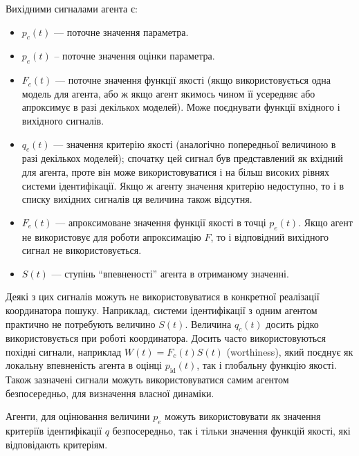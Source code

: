 Вихідними сигналами агента є:\label{atu:d:agent_out_list}

\begin{itemize}

  \item
    $p_c(t)$ ---
    поточне значення параметра.

  \item
    $p_e(t)$\label{atu:d:p_e} --
    поточне значення оцінки параметра.

  \item
    $F_c(t)$ ---
    поточне значення функції якості (якщо використовується одна
    модель для агента, або ж якщо агент якимось чином її усередняє
    або апроксимує в разі декількох моделей). Може поєднувати
    функції вхідного і вихідного сигналів.

  \item
    $q_c(t)$ ---
    значення критерію якості (аналогічно попередньої величиною в
    разі декількох моделей); спочатку цей сигнал був представлений
    як вхідний для агента, проте він може використовуватися і
    на більш високих рівнях системи ідентифікації. Якщо ж агенту
    значення критерію недоступно, то і в списку вихідних сигналів
    ця величина також відсутня.

  \item
    $F_e(t)$ ---
    апроксимоване значення функції якості в точці
    $p_e(t)$. Якщо агент не використовує для роботи апроксимацію
    $ F $, то і відповідний вихідного сигнал не використовується.

  \item
    $S(t)$ ---
    ступінь ``впевненості'' агента в отриманому значенні.

\end{itemize}

Деякі з цих сигналів можуть не використовуватися в конкретної
реалізації координатора пошуку. Наприклад, системи
ідентифікації з одним агентом практично не потребують величино
$S(t)$. Величина
$q_c(t) $ досить рідко використовується при роботі
координатора. Досить часто використовуються похідні сигнали,
наприклад
$ W(t) = F_c(t) S(t) $ (worthiness), який поєднує як локальну впевненість
агента в оцінці
$ p_\mathrm{id} (t) $, так і глобальну функцію якості. Також зазначені
сигнали можуть використовуватися самим агентом безпосередньо,
для визначення власної динаміки.


Агенти, для оцінювання величини $p_e$ можуть використовувати як значення
критеріїв ідентифікації $q$ безпосередньо, так і тільки значення функцій
якості, які відповідають критеріям.

